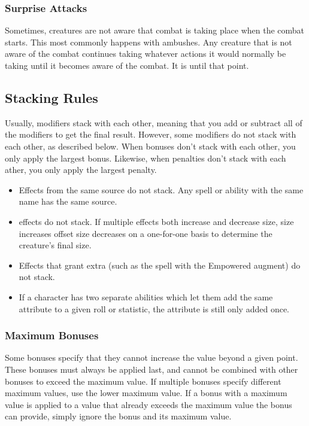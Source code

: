         \subsubsection{Surprise Attacks}\label{Surprise Attacks}
            Sometimes, creatures are not aware that combat is taking place when the combat starts. This most commonly happens with ambushes. Any creature that is not aware of the combat continues taking whatever actions it would normally be taking until it becomes aware of the combat. It is \unaware until that point.

    \subsection{Stacking Rules}\label{Stacking Rules}
        Usually, modifiers stack with each other, meaning that you add or subtract all of the modifiers to get the final result. However, some modifiers do not stack with each other, as described below. When bonuses don't stack with each other, you only apply the largest bonus. Likewise, when penalties don't stack with each ather, you only apply the largest penalty.


        \begin{itemize}
            \item Effects from the same source do not stack. Any spell or ability with the same name has the same source.
            \item {} effects do not stack.
                If multiple effects both increase and decrease size, size increases offset size decreases on a one-for-one basis to determine the creature's final size.
            \item Effects that grant extra  (such as the  spell with the Empowered augment) do not stack.
            \item If a character has two separate abilities which let them add the same attribute to a given roll or statistic, the attribute is still only added once.
        \end{itemize}

        \subsubsection{Maximum Bonuses}\label{Ability Limits}
            Some bonuses specify that they cannot increase the value beyond a given point.
            These bonuses must always be applied last, and cannot be combined with other bonuses to exceed the maximum value.
            If multiple bonuses specify different maximum values, use the lower maximum value.
            If a bonus with a maximum value is applied to a value that already exceeds the maximum value the bonus can provide, simply ignore the bonus and its maximum value.

